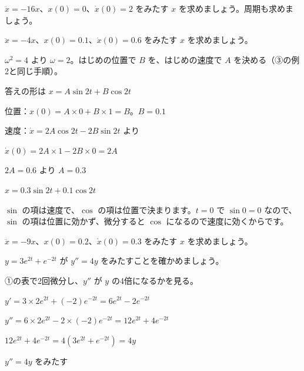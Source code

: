 \begin{jibun}
$\ddot{x}=-16x$、$x(0)=0$、$\dot{x}(0)=2$ をみたす $x$ を求めましょう。周期も求めましょう。
\end{jibun}

\begin{reidai}
$\ddot{x}=-4x$、$x(0)=0.1$、$\dot{x}(0)=0.6$ をみたす $x$ を求めましょう。\par
\kangaekata $\omega^2=4$ より $\omega=2$。はじめの位置で $B$ を、はじめの速度で $A$ を決める（③の例2と同じ手順）。\par
\shiki 答えの形は $x=A\sin2t+B\cos2t$\par
\hspace*{2.6\zw}位置：$x(0)=A\times0+B\times1=B$。$B=0.1$\par
\hspace*{2.6\zw}速度：$\dot{x}=2A\cos2t-2B\sin2t$ より\par
\hspace*{2.6\zw}$\dot{x}(0)=2A\times1-2B\times0=2A$\par
\hspace*{4.6\zw}$2A=0.6$ より $A=0.3$\par
\kotae $x=0.3\sin2t+0.1\cos2t$
\end{reidai}
$\sin$ の項は速度で、$\cos$ の項は位置で決まります。$t=0$ で $\sin0=0$ なので、$\sin$ の項は位置に効かず、微分すると $\cos$ になるので速度に効くからです。

\begin{jibun}
$\ddot{x}=-9x$、$x(0)=0.2$、$\dot{x}(0)=0.3$ をみたす $x$ を求めましょう。
\end{jibun}

\begin{reidai}[式をみたすか確かめる]
$y=3e^{2t}+e^{-2t}$ が $y''=4y$ をみたすことを確かめましょう。\par
\kangaekata ①の表で2回微分し、$y''$ が $y$ の4倍になるかを見る。\par
\shiki $y'=3\times2e^{2t}+(-2)e^{-2t}=6e^{2t}-2e^{-2t}$\par
\hspace*{2.6\zw}$y''=6\times2e^{2t}-2\times(-2)e^{-2t}=12e^{2t}+4e^{-2t}$\par
\hspace*{2.6\zw}$12e^{2t}+4e^{-2t}=4(3e^{2t}+e^{-2t})=4y$\par
\kotae $y''=4y$ をみたす
\end{reidai}


